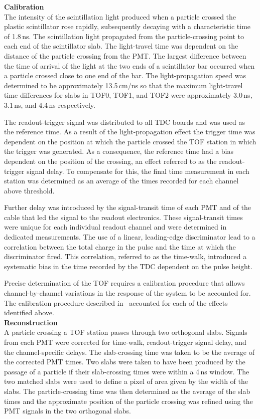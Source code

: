 \noindent\textbf{Calibration} \\
\noindent
The intensity of the scintillation light produced when a particle
crossed the plastic scintillator rose rapidly, subsequently decaying
with a characteristic time of 1.8\,ns. 
The scintillation light propagated from the particle-crossing point to
each end of the scintillator slab.
The light-travel time was dependent on the distance of the particle
crossing from the PMT.
The largest difference between the time of arrival of the light at the
two ends of a scintillator bar occurred when a particle crossed close
to one end of the bar.
The light-propagation speed was determined to be approximately
13.5\,cm/ns so that the maximum light-travel time differences
for slabs in TOF0, TOF1, and TOF2 were approximately 3.0\,ns, 3.1\,ns,
and 4.4\,ns respectively.

The readout-trigger signal was distributed to all TDC boards and was
used as the reference time.
As a result of the light-propagation effect the trigger time was
dependent on the position at which the particle crossed the TOF
station in which the trigger was generated.
As a consequence, the reference time had a bias dependent on
the position of the crossing, an effect referred to as the
readout-trigger signal delay.
To compensate for this, the final time measurement in each station was
determined as an average of the times recorded for each channel above
threshold.

Further delay was introduced by the signal-transit time of each PMT
and of the cable that led the signal to the readout electronics.
These signal-transit times were unique for each individual readout
channel and were determined in dedicated measurements.
The use of a linear, leading-edge discriminator lead to a correlation
between the total charge in the pulse and the time at which the
discriminator fired.
This correlation, referred to as the time-walk, introduced a
systematic bias in the time recorded by the TDC dependent on the pulse
height. 

Precise determination of the TOF requires a calibration procedure that
allows channel-by-channel variations in the response of the system to
be accounted for.
The calibration procedure described in~\cite{NOTE251} accounted for
each of the effects identified above. \\

\noindent\textbf{Reconstruction} \\
\noindent
A particle crossing a TOF station passes through two orthogonal
slabs.
Signals from each PMT were corrected for time-walk, readout-trigger
signal delay, and the channel-specific delays.
The slab-crossing time was taken to be the average of the corrected
PMT times.
Two slabs were taken to have been produced by the passage of a
particle if their slab-crossing times were within a 4\,ns window.
The two matched slabs were used to define a pixel of area given by the
width of the slabs.
The particle-crossing time was then determined as the average of the
slab times and the approximate position of the particle crossing was
refined using the PMT signals in the two orthogonal slabs. \\

